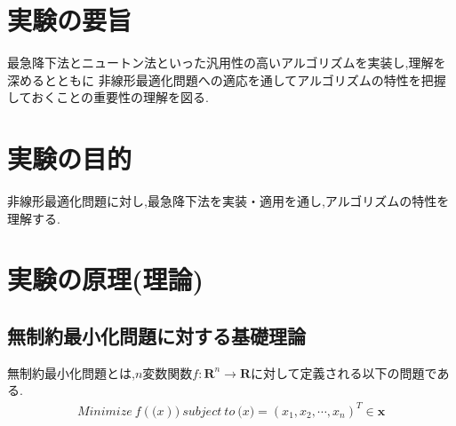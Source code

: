 \documentclass[12pt]{jarticle}
\begin{document}
\section{実験の要旨}
最急降下法とニュートン法といった汎用性の高いアルゴリズムを実装し,理解を深めるとともに
非線形最適化問題への適応を通してアルゴリズムの特性を把握しておくことの重要性の理解を図る.
\section{実験の目的}
非線形最適化問題に対し,最急降下法を実装・適用を通し,アルゴリズムの特性を理解する.
\section{実験の原理(理論)}
\subsection{無制約最小化問題に対する基礎理論}
無制約最小化問題とは,$n$変数関数$f:\boldsymbol{R}^n \rightarrow \boldsymbol{R}$に対して定義される以下の問題である.
\begin{eqnarray}
    Minimize\ f(\boldsymbol(x))\ subject\ to\ \boldsymbol(x)=(x_1,x_2,\cdots,x_n)^T \in \boldsymbol{x}\nonumber
\end{eqnarray}
\end{document}
